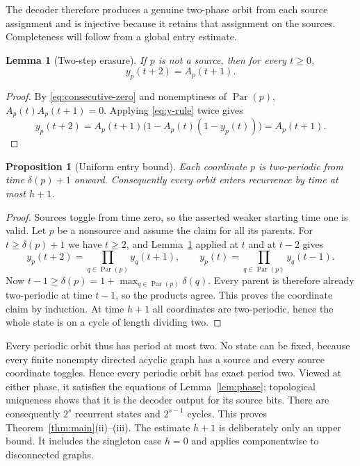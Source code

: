 \documentclass[10pt,a4paper]{amsart}
\newtheorem{proposition}[theorem]{Proposition}
\newtheorem{lemma}[theorem]{Lemma}
\theoremstyle{definition}
\theoremstyle{remark}
\newcommand{\Par}{\operatorname{Par}}
\begin{document}
The decoder therefore produces a genuine two-phase orbit from each source
assignment and is injective because it retains that assignment on the
sources.  Completeness will follow from a global entry estimate.

\begin{lemma}[Two-step erasure]\label{lem:erasure}
If $p$ is not a source, then for every $t\geq0$,
\begin{equation}\label{eq:erasure}
                               y_p(t+2)=A_p(t+1).
\end{equation}
\end{lemma}

\begin{proof}
By \eqref{eq:consecutive-zero} and nonemptiness of $\Par(p)$,
$A_p(t)A_p(t+1)=0$.  Applying \eqref{eq:y-rule} twice gives
\[
 y_p(t+2)=A_p(t+1)\bigl(1-A_p(t)(1-y_p(t))\bigr)=A_p(t+1).
\]
\end{proof}

\begin{proposition}[Uniform entry bound]\label{prop:entry}
Each coordinate $p$ is two-periodic from time $\delta(p)+1$ onward.
Consequently every orbit enters recurrence by time at most $h+1$.
\end{proposition}

\begin{proof}
Sources toggle from time zero, so the asserted weaker starting time one is
valid.  Let $p$ be a nonsource and assume the claim for all its parents.
For $t\geq\delta(p)+1$ we have $t\geq2$, and Lemma~\ref{lem:erasure}
applied at $t$ and at $t-2$ gives
\[
 y_p(t+2)=\prod_{q\in\Par(p)}y_q(t+1),\qquad
 y_p(t)=\prod_{q\in\Par(p)}y_q(t-1).
\]
Now $t-1\geq\delta(p)=1+\max_{q\in\Par(p)}\delta(q)$.  Every parent is
therefore already two-periodic at time $t-1$, so the products agree.  This
proves the coordinate claim by induction.  At time $h+1$ all coordinates
are two-periodic, hence the whole state is on a cycle of length dividing
two.
\end{proof}

Every periodic orbit thus has period at most two.  No state can be fixed,
because every finite nonempty directed acyclic graph has a source and every
source coordinate toggles.  Hence every periodic orbit has exact period two.
Viewed at either phase, it satisfies the equations of
Lemma~\ref{lem:phase}; topological uniqueness shows that it is the decoder
output for its source bits.  There are consequently $2^s$ recurrent states
and $2^{s-1}$ cycles.  This proves Theorem~\ref{thm:main}(ii)--(iii).
The estimate $h+1$ is deliberately only an upper bound.  It includes the
singleton case $h=0$ and applies componentwise to disconnected graphs.
\end{document}
